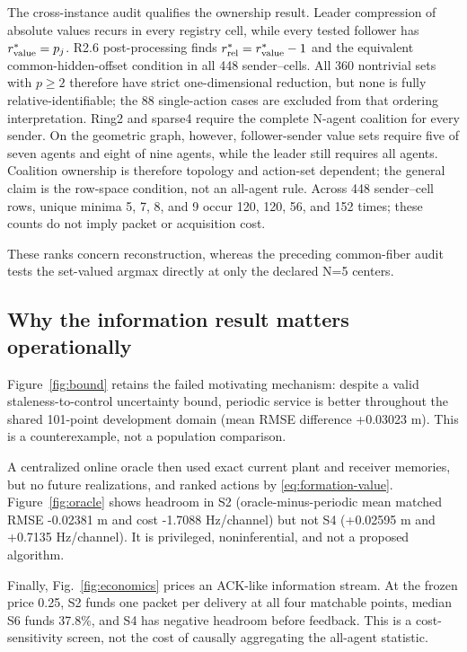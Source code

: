 \documentclass[10pt,twocolumn,twoside]{IEEEtran}
\begin{document}
The cross-instance audit qualifies the ownership result.  Leader compression
of absolute values recurs in every registry cell, while every tested follower
has \(r_{\rm value}^*=p_j\).  R2.6 post-processing finds
\(r_{\rm rel}^*=r_{\rm value}^*-1\) and the equivalent common-hidden-offset
condition in all 448 sender--cells.  All 360 nontrivial sets with \(p\ge2\)
therefore have strict one-dimensional reduction, but none is fully
relative-identifiable; the 88 single-action cases are excluded from that
ordering interpretation.  Ring2 and sparse4 require the complete
N-agent coalition for every sender.  On the geometric graph, however,
follower-sender value sets require five of seven agents and eight of nine
agents, while the leader still requires all agents.  Coalition ownership is
therefore topology and action-set dependent; the general claim is the
row-space condition, not an all-agent rule.  Across 448 sender--cell rows,
unique minima 5, 7, 8, and 9 occur 120, 120, 56, and 152 times; these counts do
not imply packet or acquisition cost.

These ranks concern reconstruction, whereas the preceding common-fiber audit
tests the set-valued argmax directly at only the declared N=5 centers.

\subsection{Why the information result matters operationally}

Figure~\ref{fig:bound} retains the failed motivating mechanism: despite a valid
staleness-to-control uncertainty bound, periodic service is better throughout
the shared 101-point development domain (mean RMSE difference +0.03023 m).
This is a counterexample, not a population comparison.

A centralized online oracle then used exact current plant and receiver
memories, but no future realizations, and ranked actions by
\eqref{eq:formation-value}.  Figure~\ref{fig:oracle} shows headroom in S2
(oracle-minus-periodic mean matched RMSE -0.02381 m and cost -1.7088
Hz/channel) but not S4 (+0.02595 m and +0.7135 Hz/channel).  It is privileged,
noninferential, and not a proposed algorithm.

Finally, Fig.~\ref{fig:economics} prices an ACK-like information stream.  At
the frozen price 0.25, S2 funds one packet per delivery at all four matchable
points, median S6 funds 37.8\%, and S4 has negative headroom before feedback.
This is a cost-sensitivity screen, not the cost of causally aggregating the
all-agent statistic.
\end{document}
